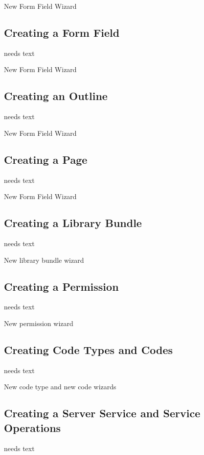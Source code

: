 \documentclass[a4paper,10pt,twoside]{book}
\begin{document}
New Form Field Wizard

\subsection{Creating a Form Field}
needs text

New Form Field Wizard

\subsection{Creating an Outline}
needs text

New Form Field Wizard

\subsection{Creating a Page}
needs text

New Form Field Wizard


\subsection{Creating a Library Bundle}
needs text

New library bundle wizard

\subsection{Creating a Permission}
needs text

New permission wizard

\subsection{Creating Code Types and Codes}
needs text

New code type and new code wizards

\subsection{Creating a Server Service and Service Operations}
needs text
\end{document}

